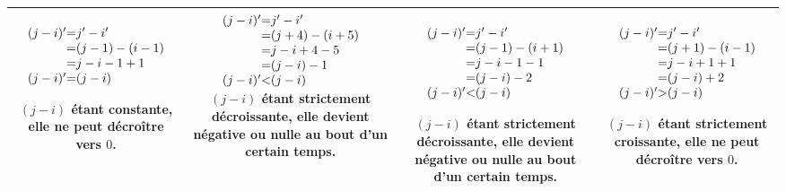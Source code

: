 \documentclass[a4paper,10pt]{article}
\begin{document}
\begin{tabular}{|c|c|c|c|}
\hline
\begin{minipage}[c][4.1cm][c]{.23\linewidth}
$\begin{array}[t]{r@{}c@{}l}
(j - i)' &=& j' - i'\\
 &=& (j - 1) - (i - 1)\\
 &=& j - i -1+1\\
(j - i)'  &=& (j - i)\\
\end{array}$ \vfill

$(j-i)$ étant constante, elle ne peut décroître vers $0$.


\end{minipage}
&
\begin{minipage}[c][4.1cm][c]{.23\linewidth}
$\begin{array}[t]{r@{}c@{}l}
(j - i)' &=& j' - i'\\
 &=& (j + 4) - (i + 5)\\
 &=& j - i + 4 - 5\\
 &=& (j - i) - 1\\
(j - i)'&<&(j-i)\\
\end{array}$ \vfill
$(j-i)$ étant strictement décroissante, elle devient négative ou nulle au bout d'un certain temps.


\end{minipage}
&
\begin{minipage}[c][4.1cm][c]{.23\linewidth}
$\begin{array}[t]{r@{}c@{}l}
(j - i)' &=& j' - i'\\
 &=& (j - 1) - (i +1)\\
 &=& j - i - 1 - 1\\
  &=& (j - i)-2\\
(j - i)'&<&(j-i)\\
\end{array}$ \vfill

$(j-i)$ étant strictement décroissante, elle devient négative ou nulle au bout d'un certain temps.


\end{minipage}
&
\begin{minipage}[c][4.1cm][c]{.23\linewidth}
$\begin{array}[t]{r@{}c@{}l}
(j - i)' &=& j' - i'\\
 &=& (j + 1) - (i - 1)\\
 &=& j - i +1+1\\
 &=& (j - i) + 2\\
(j - i)'&>&(j-i)\\
\end{array}$ \vfill

$(j-i)$ étant strictement croissante, elle ne peut décroître vers $0$.


\end{minipage}
\\
\hline
\end{tabular}
\end{document}
